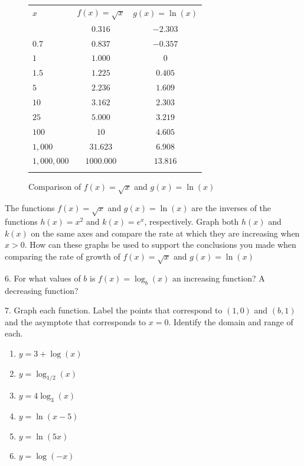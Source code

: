 \documentclass[10pt,]{book}
\theoremstyle{plain}
\theoremstyle{definition}
\theoremstyle{definition}
\theoremstyle{definition}
\numberwithin{equation}{section}
\newcommand{\hrulemedium}{\noalign{\hrule height 0.07em}}
\newcommand{\hrulethick} {\noalign{\hrule height 0.11em}}
\newcommand{\gt}{>}
\begin{document}
\begin{exerciselist}
\begin{figure}
\begin{tabular}{ccc}
\multicolumn{1}{l}{\(x\)}&\(f(x) = \sqrt{x}\)&\(g(x) = \ln(x)\)\tabularnewline\hrulemedium
\multicolumn{1}{l}{\(0.1\)}&\(0.316\)&\(-2.303\)\tabularnewline[0pt]
\multicolumn{1}{l}{\(0.7\)}&\(0.837\)&\(-0.357\)\tabularnewline[0pt]
\multicolumn{1}{l}{\(1\)}&\(1.000\)&\(0\)\tabularnewline[0pt]
\multicolumn{1}{l}{\(1.5\)}&\(1.225\)&\(0.405\)\tabularnewline[0pt]
\multicolumn{1}{l}{\(5\)}&\(2.236\)&\(1.609\)\tabularnewline[0pt]
\multicolumn{1}{l}{\(10\)}&\(3.162\)&\(2.303\)\tabularnewline[0pt]
\multicolumn{1}{l}{\(25\)}&\(5.000\)&\(3.219\)\tabularnewline[0pt]
\multicolumn{1}{l}{\(100\)}&\(10\)&\(4.605\)\tabularnewline[0pt]
\multicolumn{1}{l}{\(1,000\)}&\(31.623\)&\(6.908\)\tabularnewline[0pt]
\multicolumn{1}{l}{\(1,000,000\)}&\(1000.000\)&\(13.816\)\tabularnewline\hrulethick
\end{tabular}
\caption{Comparison of \(f(x) = \sqrt{x}\) and \(g(x) = \ln(x)\)\label{figure-31}}
\end{figure}
 The functions \(f(x) = \sqrt{x}\) and \(g(x) = \ln(x)\) are the inverses of the functions \(h(x) = x^2\) and \(k(x) = e^x\), respectively. Graph both \(h(x)\) and \(k(x)\) on the same axes and compare the rate at which they are increasing when \(x \gt 0\). How can these graphs be used to support the conclusions you made when comparing the rate of growth of \(f(x) = \sqrt{x}\) and \(g(x) = \ln(x)\)%
\par\smallskip
\item[6.]\hypertarget{exercise-96}{}\hypertarget{p-362}{}%
For what values of \(b\) is \(f(x) = \log_b \left( x \right )\) an increasing function? A decreasing function?%
\par\smallskip
\item[7.]\hypertarget{exercise-97}{}\hypertarget{p-363}{}%
Graph each function.  Label the points that correspond to \(\left( 1,0 \right)\) and \(\left( b,1 \right)\) and the asymptote that corresponds to \(x = 0\). Identify the domain and range of each. \leavevmode%
\begin{enumerate}[label=(\alph*)]
\item\hypertarget{li-259}{}\(y = 3 + \log \left( x \right)\)%
\item\hypertarget{li-260}{}\(y = \log_{1/2} \left( x \right)\)%
\item\hypertarget{li-261}{}\(y = 4 \log_3 \left( x \right)\)%
\item\hypertarget{li-262}{}\(y = \ln \left( x - 5 \right)\)%
\item\hypertarget{li-263}{}\(y = \ln \left( 5x \right)\)%
\item\hypertarget{li-264}{}\(y = \log \left( -x \right)\)%

\end{enumerate}
\end{exerciselist}
\end{document}
